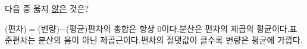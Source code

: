 다음 중 옳지 \underline{않은} 것은?
\begin{choicesv}{(편차)$=$(변량)$-$(평균)}{편차의 총합은 항상 0이다.}{분산은 편차의 제곱의 평균이다.}{표준편차는 분산의 음이 아닌 제곱근이다.}{편차의 절댓값이 클수록 변량은 평균에 가깝다.}\end{choicesv}

